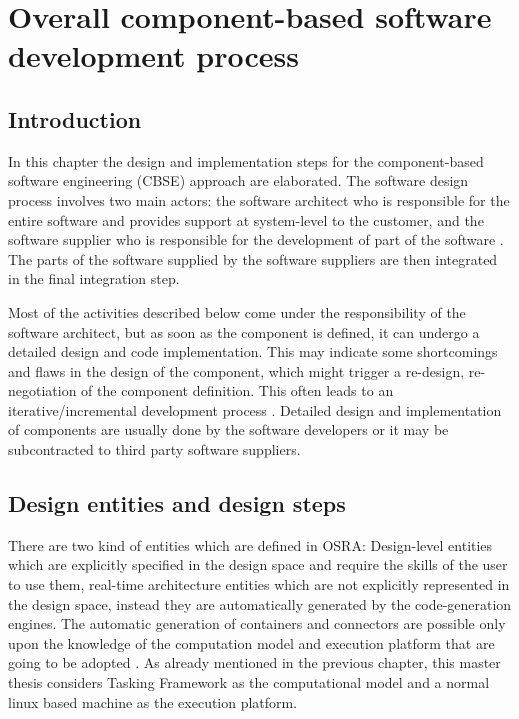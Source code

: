 
\chapter{Overall component-based software development process}
\label{chap: Software development process}
\section{Introduction}
In this chapter the design and implementation steps for the component-based software engineering (CBSE) approach are elaborated. The software design process involves two main actors: the software architect who is responsible for the entire software and provides support at system-level to the customer, and the software supplier who is responsible for the development of part of the software \cite{CompBasedProcess}. The parts of the software supplied by the software suppliers are then integrated in the final integration step.

Most of the activities described below come under the responsibility of the software architect, but as soon as the component is defined, it can undergo a detailed design and code implementation. This may indicate some shortcomings and flaws in the design of the component, which might trigger a re-design, re-negotiation of the component definition. This often leads to an iterative/incremental development process \cite{ScheduAnaly}. Detailed design and implementation of components are usually done by the software developers or it may be subcontracted to third party software suppliers. 

\section{Design entities and design steps}
\label{section: Design steps}
There are two kind of entities which are defined in OSRA: Design-level entities which are explicitly specified in the design space and require the skills of the user to use them, real-time architecture entities which are not explicitly represented in the design space, instead they are automatically generated by the code-generation engines. The automatic generation of containers and connectors are possible only upon the knowledge of the computation model and execution platform that are going to be adopted \cite{SAVOIR}\cite{CompBasedProcess}. As already mentioned in the previous chapter, this master thesis considers Tasking Framework as the computational model and a normal linux based machine as the execution platform.   

